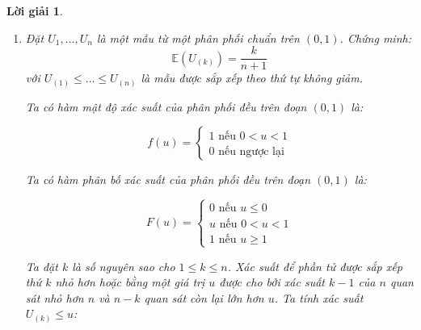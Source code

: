 \documentclass[14pt, a4paper]{article}
\theoremstyle{sltheorem}
\theoremstyle{soltheorem}
\newtheorem*{loigiai}{Lời giải}
\begin{document}
\begin{loigiai}
\begin{enumerate}[wide, labelwidth=!, labelindent=0pt,label=\textbf{\arabic*}.]
\begin{enumerate}
            Mặt khác, hai số $c, d \in (0, 1)$ và $Y \sim U \lbrack 0; 1 \rbrack$:

            \begin{equation*}
                P(c < Y < d) = d - c
            \end{equation*}

            Từ hai điều trên, ta nhận thấy $X_1, \dots, X_n$ được lấy mẫu từ phân bố chuẩn tắc thì tương đương $\Phi(X_1), \dots, \Phi(X_n)$ được lấy mẫu từ phân phối đều trên $(0,1)$.

            \item Đặt $U_1, \dots, U_n$ là một mẫu từ một phân phối chuẩn trên $(0, 1)$. Chứng minh:
            \begin{equation*}
                \mathbb{E} (U_{(k)}) = \dfrac{k}{n+1}
            \end{equation*}
            với $U_{(1)} \leq \dots \leq U_{(n)}$ là mẫu được sắp xếp theo thứ tự không giảm.
            
            Ta có hàm mật độ xác suất của phân phối đều trên đoạn $(0, 1)$ là:

            \begin{equation*}
                f(u) = \begin{cases}
                    1 \text{ nếu } 0 < u < 1 \\
                    0 \text{ nếu ngược lại}
                \end{cases}
            \end{equation*}

            Ta có hàm phân bố xác suất của phân phối đều trên đoạn $(0, 1)$ là:

            \begin{equation*}
                F(u) = \begin{cases}
                    0 \text{ nếu } u \leq 0 \\
                    u \text{ nếu } 0 < u < 1 \\
                    1 \text{ nếu } u \geq 1                    
                \end{cases}
            \end{equation*}

            Ta đặt $k$ là số nguyên sao cho $1 \leq k \leq n$.
            Xác suất để phần tử được sắp xếp thứ $k$ nhỏ hơn hoặc bằng một giá trị $u$ được cho bởi xác suất $k-1$ của $n$ quan sát nhỏ hơn $n$ và $n-k$ quan sát còn lại lớn hơn $u$.
            Ta tính xác suất $U_{(k)} \leq u$:


\end{enumerate}
\end{enumerate}
\end{loigiai}
\end{document}
